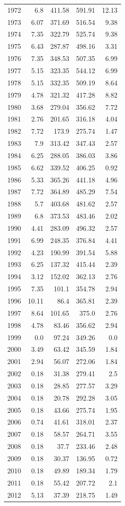 \documentclass[a4paper]{article}
\begin{document}
\begin{longtable}{rrrrr}
1972 & 6.8 & 411.58 & 591.91 & 12.13\\
1973 & 6.07 & 371.69 & 516.54 & 9.38\\
1974 & 7.35 & 322.79 & 525.74 & 9.38\\
1975 & 6.43 & 287.87 & 498.16 & 3.31\\
1976 & 7.35 & 348.53 & 507.35 & 6.99\\
1977 & 5.15 & 323.35 & 544.12 & 6.99\\
1978 & 5.15 & 332.35 & 509.19 & 8.64\\
1979 & 4.78 & 321.32 & 417.28 & 8.82\\
1980 & 3.68 & 279.04 & 356.62 & 7.72\\
1981 & 2.76 & 201.65 & 316.18 & 4.04\\
1982 & 7.72 & 173.9 & 275.74 & 1.47\\
1983 & 7.9 & 313.42 & 347.43 & 2.57\\
1984 & 6.25 & 288.05 & 386.03 & 3.86\\
1985 & 6.62 & 339.52 & 406.25 & 0.92\\
1986 & 5.33 & 365.26 & 441.18 & 4.96\\
1987 & 7.72 & 364.89 & 485.29 & 7.54\\
1988 & 5.7 & 403.68 & 481.62 & 2.57\\
1989 & 6.8 & 373.53 & 483.46 & 2.02\\
1990 & 4.41 & 283.09 & 496.32 & 2.57\\
1991 & 6.99 & 248.35 & 376.84 & 4.41\\
1992 & 4.23 & 190.99 & 391.54 & 5.88\\
1993 & 6.25 & 137.32 & 415.44 & 2.39\\
1994 & 3.12 & 152.02 & 362.13 & 2.76\\
1995 & 7.35 & 101.1 & 354.78 & 2.94\\
1996 & 10.11 & 86.4 & 365.81 & 2.39\\
1997 & 8.64 & 101.65 & 375.0 & 2.76\\
1998 & 4.78 & 83.46 & 356.62 & 2.94\\
1999 & 0.0 & 97.24 & 349.26 & 0.0\\
2000 & 3.49 & 63.42 & 345.59 & 1.84\\
2001 & 2.94 & 56.07 & 272.06 & 1.84\\
2002 & 0.18 & 31.38 & 279.41 & 2.5\\
2003 & 0.18 & 28.85 & 277.57 & 3.29\\
2004 & 0.18 & 20.78 & 292.28 & 3.05\\
2005 & 0.18 & 43.66 & 275.74 & 1.95\\
2006 & 0.74 & 41.61 & 318.01 & 2.37\\
2007 & 0.18 & 58.57 & 264.71 & 3.55\\
2008 & 0.18 & 37.7 & 233.46 & 2.48\\
2009 & 0.18 & 30.37 & 136.95 & 0.72\\
2010 & 0.18 & 49.89 & 189.34 & 1.79\\
2011 & 0.18 & 55.42 & 207.72 & 2.1\\
2012 & 5.13 & 37.39 & 218.75 & 1.49\\
\end{longtable}
\end{document}
